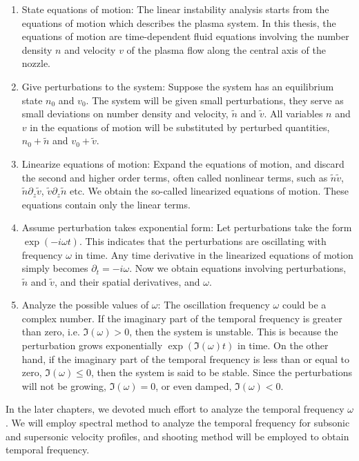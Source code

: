 \begin{enumerate}
	\item State equations of motion: The linear instability analysis starts from the equations of motion which describes the plasma system. In this thesis, the equations of motion are time-dependent fluid equations involving the number density $n$ and velocity $v$ of the plasma flow along the central axis of the nozzle.
	\item Give perturbations to the system: Suppose the system has an equilibrium state $n_0$ and $v_0$. The system will be given small perturbations, they serve as small deviations on number density and velocity, $\tilde{n}$ and $\tilde{v}$. All variables $n$ and $v$ in the equations of motion will be substituted by perturbed quantities, $n_0+\tilde{n}$ and $v_0+\tilde{v}$.
	\item Linearize equations of motion: Expand the equations of motion, and discard the second and higher order terms, often called nonlinear terms, such as $\tilde{n}\tilde{v}$, $\tilde{n}\partial_z\tilde{v}$, $\tilde{v}\partial_z\tilde{n}$ etc. We obtain the so-called linearized equations of motion. These equations contain only the linear terms.
	\item Assume perturbation takes exponential form: Let perturbations take the form $\exp(-i\omega t)$. This indicates that the perturbations are oscillating with frequency $\omega$ in time. Any time derivative in the linearized equations of motion simply becomes $\partial_t = -i\omega$. Now we obtain equations involving perturbations, $\tilde{n}$ and $\tilde{v}$, and their spatial derivatives, and $\omega$.
	\item Analyze the possible values of $\omega$: The oscillation frequency $\omega$ could be a complex number. If the imaginary part of the temporal frequency is greater than zero, i.e. $\Im(\omega) > 0$, then the system is unstable. This is because the perturbation grows exponentially $\exp(\Im(\omega)t)$ in time. On the other hand, if the imaginary part of the temporal frequency is less than or equal to zero, $\Im(\omega) \leq 0$, then the system is said to be stable. Since the perturbations will not be growing, $\Im(\omega)=0$, or even damped, $\Im(\omega) < 0$.
\end{enumerate}

In the later chapters, we devoted much effort to analyze the temporal frequency $\omega$. We will employ spectral method to analyze the temporal frequency for subsonic and supersonic velocity profiles, and shooting method will be employed to obtain temporal frequency.

